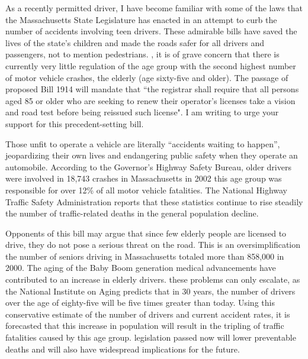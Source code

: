 \documentclass[12pt]{book}
\renewcommand{\indent}{\hspace{1cm}}
\newcommand{\longline}{\underline{\hspace{2in}} }
\begin{document}
\begin{spacing}{2}
\begin{linenumbers*}
\modulolinenumbers[5]
\indent As a recently permitted driver, I have become familiar with some of the laws that the Massachusetts State Legislature has enacted in an attempt to curb the number of accidents involving teen drivers. These admirable bills have saved the lives of the state's children and made the roads safer for all drivers and passengers, not to mention pedestrians.\longline, it is of grave concern that there is currently very little regulation of the age group with the second highest number of motor vehicle crashes, the elderly (age sixty-five and older). The passage of proposed Bill 1914 will mandate that ``the registrar shall require that all persons aged 85 or older who are seeking to renew their operator's licenses take a vision and road test before being reissued such license". \longline I am writing to urge your support for this precedent-setting bill.

\indent Those unfit to operate a vehicle are literally “accidents waiting to happen”, jeopardizing their own lives and endangering public safety when they operate an automobile. According to the Governor's Highway Safety Bureau, older drivers were involved in 18,743 crashes in Massachusetts in 2002 \longline this age group was responsible for over 12\% of all motor vehicle fatalities. The National Highway Traffic Safety Administration reports that these statistics continue to rise steadily \longline the number of traffic-related deaths in the general population decline.

\indent Opponents of this bill may argue that since few elderly people are licensed to drive, they do not pose a serious threat on the road. This is an oversimplification \longline the number of seniors driving in Massachusetts totaled more than 858,000 in 2000. The aging of the Baby Boom generation \longline medical advancements have contributed to an increase in elderly drivers. \longline these problems can only escalate, as the National Institute on Aging predicts that in 30 years, the number of drivers over the age of eighty-five will be five times greater than today. Using this conservative estimate of the number of drivers and current accident rates, it is forecasted that this increase in population will result in the tripling of traffic fatalities caused by this age group.\longline legislation passed now will lower preventable deaths and will also have widespread implications for the future.


\end{linenumbers*}
\end{spacing}
\end{document}
